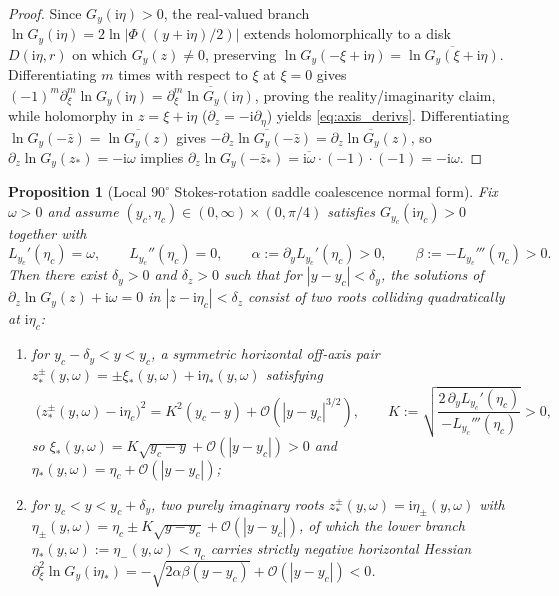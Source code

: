 \documentclass[11pt,a4paper,reqno]{amsart}
\newtheorem{proposition}[theorem]{Proposition}
\theoremstyle{definition}
\theoremstyle{remark}
\numberwithin{equation}{section}
\newcommand{\ii}{\mathrm{i}}
\begin{document}
\begin{proof}
Since $G_y(\ii\eta) > 0$, the real-valued branch $\ln G_y(\ii\eta) = 2\ln|\Phi((y+\ii\eta)/2)|$ extends holomorphically to a disk $D(\ii\eta, r)$ on which $G_y(z) \neq 0$, preserving $\ln G_y(-\xi+\ii\eta) = \overline{\ln G_y(\xi+\ii\eta)}$. Differentiating $m$ times with respect to $\xi$ at $\xi = 0$ gives $(-1)^m\partial_\xi^m\ln G_y(\ii\eta) = \overline{\partial_\xi^m\ln G_y(\ii\eta)}$, proving the reality/imaginarity claim, while holomorphy in $z = \xi + \ii\eta$ ($\partial_z = -\ii\partial_\eta$) yields \eqref{eq:axis_derivs}. Differentiating $\ln G_y(-\bar{z}) = \overline{\ln G_y(z)}$ gives $-\overline{\partial_z\ln G_y(-\bar{z})} = \overline{\partial_z\ln G_y(z)}$, so $\partial_z\ln G_y(z_*) = -\ii\omega$ implies $\partial_z\ln G_y(-\bar{z}_*) = \overline{\ii\omega}\cdot(-1)\cdot(-1) = -\ii\omega$.
\end{proof}

\begin{proposition}[Local $90^\circ$ Stokes-rotation saddle coalescence normal form]\label{prop:local_pitchfork}
Fix $\omega > 0$ and assume $(y_c, \eta_c) \in (0,\infty)\times(0,\pi/4)$ satisfies $G_{y_c}(\ii\eta_c) > 0$ together with
\begin{equation}\label{eq:bif_hypotheses}
L_{y_c}'(\eta_c) = \omega, \qquad L_{y_c}''(\eta_c) = 0, \qquad \alpha := \partial_y L_{y_c}'(\eta_c) > 0, \qquad \beta := -L_{y_c}'''(\eta_c) > 0.
\end{equation}
Then there exist $\delta_y > 0$ and $\delta_z > 0$ such that for $|y - y_c| < \delta_y$, the solutions of $\partial_z\ln G_y(z) + \ii\omega = 0$ in $|z - \ii\eta_c| < \delta_z$ consist of two roots colliding quadratically at $\ii\eta_c$:
\begin{enumerate}
\item[\textup{(i)}] for $y_c - \delta_y < y < y_c$, a symmetric horizontal off-axis pair $z_*^\pm(y,\omega) = \pm\xi_*(y,\omega) + \ii\eta_*(y,\omega)$ satisfying
\begin{equation}\label{eq:boxed_pitchfork}
\boxed{\;
\big(z_*^\pm(y,\omega) - \ii\eta_c\big)^2 = K^2(y_c - y) + \mathcal{O}\!\left(|y - y_c|^{3/2}\right), \qquad K := \sqrt{\frac{2\,\partial_y L_{y_c}'(\eta_c)}{-L_{y_c}'''(\eta_c)}} > 0,
\;}
\end{equation}
so $\xi_*(y,\omega) = K\sqrt{y_c - y} + \mathcal{O}(|y-y_c|) > 0$ and $\eta_*(y,\omega) = \eta_c + \mathcal{O}(|y-y_c|)$;
\item[\textup{(ii)}] for $y_c < y < y_c + \delta_y$, two purely imaginary roots $z_*^\pm(y,\omega) = \ii\eta_\pm(y,\omega)$ with $\eta_\pm(y,\omega) = \eta_c \pm K\sqrt{y - y_c} + \mathcal{O}(|y-y_c|)$, of which the lower branch $\eta_*(y,\omega) := \eta_-(y,\omega) < \eta_c$ carries strictly negative horizontal Hessian $\partial_\xi^2\ln G_y(\ii\eta_*) = -\sqrt{2\alpha\beta(y - y_c)} + \mathcal{O}(|y-y_c|) < 0$.
\end{enumerate}
\end{proposition}
\end{document}
